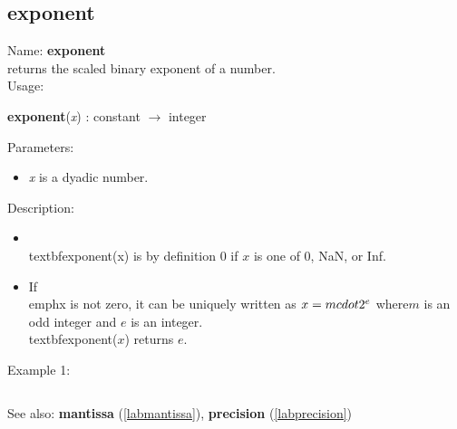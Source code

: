 \subsection{exponent}
\label{labexponent}
\noindent Name: \textbf{exponent}\\
returns the scaled binary exponent of a number.\\
\noindent Usage: 
\begin{center}
\textbf{exponent}(\emph{x}) : \textsf{constant} $\rightarrow$ \textsf{integer}\\
\end{center}
Parameters: 
\begin{itemize}
\item \emph{x} is a dyadic number.
\end{itemize}
\noindent Description: \begin{itemize}

\item \\textbf{exponent}(x) is by definition 0 if $x$ is one of 0, NaN, or Inf.\n
\item If \\emph{x} is not zero, it can be uniquely written as $x = m \\cdot 2^e$ where\n   $m$ is an odd integer and $e$ is an integer. \\textbf{exponent}($x$) returns $e$. \n\end{itemize}
\noindent Example 1: 
\begin{center}\begin{minipage}{15cm}\begin{Verbatim}[frame=single]
\end{Verbatim}
\end{minipage}\end{center}
See also: \textbf{mantissa} (\ref{labmantissa}), \textbf{precision} (\ref{labprecision})
